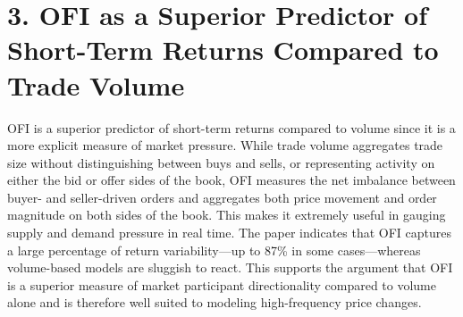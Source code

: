\documentclass{article}
\begin{document}
\section*{3. OFI as a Superior Predictor of Short-Term Returns Compared to Trade Volume}
OFI is a superior predictor of short-term returns compared to volume since it is a more explicit measure of market pressure. While trade volume aggregates trade size without distinguishing between buys and sells, or representing activity on either the bid or offer sides of the book, OFI measures the net imbalance between buyer- and seller-driven orders and aggregates both price movement and order magnitude on both sides of the book. This makes it extremely useful in gauging supply and demand pressure in real time. The paper indicates that OFI captures a large percentage of return variability—up to 87\% in some cases—whereas volume-based models are sluggish to react. This supports the argument that OFI is a superior measure of market participant directionality compared to volume alone and is therefore well suited to modeling high-frequency price changes.
\end{document}

